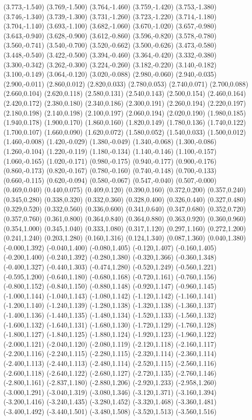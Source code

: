 (3.773,-1.540) (3.769,-1.500) (3.764,-1.460) (3.759,-1.420) (3.753,-1.380) (3.746,-1.340) (3.739,-1.300) (3.731,-1.260) (3.723,-1.220) (3.714,-1.180) (3.704,-1.140) (3.693,-1.100) (3.682,-1.060) (3.670,-1.020) (3.657,-0.980) (3.643,-0.940) (3.628,-0.900) (3.612,-0.860) (3.596,-0.820) (3.578,-0.780) (3.560,-0.741) (3.540,-0.700) (3.520,-0.662) (3.500,-0.626) (3.473,-0.580) (3.448,-0.540) (3.422,-0.500) (3.394,-0.460) (3.364,-0.420) (3.332,-0.380) (3.300,-0.342) (3.262,-0.300) (3.224,-0.260) (3.182,-0.220) (3.140,-0.182) (3.100,-0.149) (3.064,-0.120) (3.020,-0.088) (2.980,-0.060) (2.940,-0.035) (2.900,-0.011) (2.860,0.012) (2.820,0.033) (2.780,0.053) (2.740,0.071) (2.700,0.088) (2.660,0.104) (2.620,0.118) (2.580,0.131) (2.540,0.143) (2.500,0.154) (2.460,0.164) (2.420,0.172) (2.380,0.180) (2.340,0.186) (2.300,0.191) (2.260,0.194) (2.220,0.197) (2.180,0.198) (2.140,0.198) (2.100,0.197) (2.060,0.194) (2.020,0.190) (1.980,0.185) (1.940,0.178) (1.900,0.170) (1.860,0.160) (1.820,0.149) (1.780,0.136) (1.740,0.122) (1.700,0.107) (1.660,0.090) (1.620,0.072) (1.580,0.052) (1.540,0.033) (1.500,0.012) (1.460,-0.008) (1.420,-0.029) (1.380,-0.049) (1.340,-0.068) (1.300,-0.086) (1.260,-0.104) (1.220,-0.119) (1.180,-0.134) (1.140,-0.146) (1.100,-0.157) (1.060,-0.165) (1.020,-0.171) (0.980,-0.175) (0.940,-0.177) (0.900,-0.176) (0.860,-0.173) (0.820,-0.167) (0.780,-0.160) (0.740,-0.148) (0.700,-0.133) (0.660,-0.115) (0.620,-0.094) (0.580,-0.067) (0.547,-0.040) (0.507,-0.000) (0.469,0.040) (0.440,0.075) (0.409,0.120) (0.390,0.160) (0.372,0.200) (0.357,0.240) (0.345,0.280) (0.338,0.320) (0.332,0.360) (0.328,0.400) (0.326,0.440) (0.327,0.480) (0.329,0.520) (0.332,0.560) (0.336,0.600) (0.341,0.640) (0.347,0.680) (0.352,0.720) (0.357,0.760) (0.361,0.800) (0.364,0.840) (0.364,0.880) (0.363,0.920) (0.360,0.960) (0.354,1.000) (0.345,1.040) (0.333,1.080) (0.317,1.120) (0.297,1.160) (0.272,1.200) (0.241,1.240) (0.203,1.280) (0.160,1.316) (0.124,1.340) (0.087,1.360) (0.040,1.380) (-0.000,1.392) (-0.040,1.400) (-0.080,1.405) (-0.120,1.407) (-0.160,1.405) (-0.200,1.400) (-0.240,1.392) (-0.280,1.380) (-0.320,1.366) (-0.360,1.348) (-0.400,1.327) (-0.440,1.303) (-0.474,1.280) (-0.520,1.249) (-0.560,1.221) (-0.595,1.200) (-0.640,1.180) (-0.680,1.168) (-0.720,1.161) (-0.760,1.156) (-0.800,1.152) (-0.840,1.150) (-0.880,1.148) (-0.920,1.147) (-0.960,1.145) (-1.000,1.144) (-1.040,1.143) (-1.080,1.142) (-1.120,1.142) (-1.160,1.141) (-1.200,1.140) (-1.240,1.139) (-1.280,1.138) (-1.320,1.138) (-1.360,1.137) (-1.400,1.136) (-1.440,1.135) (-1.480,1.134) (-1.520,1.133) (-1.560,1.132) (-1.600,1.132) (-1.640,1.131) (-1.680,1.130) (-1.720,1.129) (-1.760,1.128) (-1.800,1.127) (-1.840,1.125) (-1.880,1.124) (-1.920,1.123) (-1.960,1.122) (-2.000,1.121) (-2.040,1.120) (-2.080,1.119) (-2.120,1.118) (-2.160,1.117) (-2.200,1.116) (-2.240,1.115) (-2.280,1.115) (-2.320,1.114) (-2.360,1.114) (-2.400,1.113) (-2.440,1.113) (-2.480,1.114) (-2.520,1.115) (-2.560,1.116) (-2.600,1.118) (-2.640,1.122) (-2.680,1.127) (-2.720,1.135) (-2.760,1.146) (-2.800,1.161) (-2.837,1.180) (-2.880,1.206) (-2.920,1.233) (-2.958,1.260) (-3.000,1.291) (-3.040,1.319) (-3.080,1.346) (-3.120,1.371) (-3.160,1.394) (-3.200,1.416) (-3.240,1.435) (-3.280,1.452) (-3.320,1.468) (-3.360,1.481) (-3.400,1.492) (-3.440,1.501) (-3.480,1.508) (-3.520,1.513) (-3.560,1.516) 